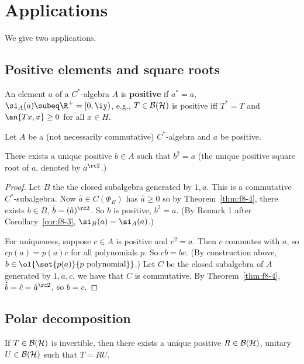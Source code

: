 \section{Applications}
We give two applications.

\subsection{Positive elements and square roots}
\begin{df}
An element $a$ of a $C^*$-algebra $A$ is \textbf{positive} if $a^*=a$, $\si_A(a)\subeq \R^+=[0,\iy)$, e.g., $T\in \cal B(H)$ is positive iff $T^*=T$ and $\an{Tx,x}\ge 0$ for all $x\in H$. 
\end{df}
\begin{thm}
Let $A$ be a (not necessarily commutative) $C^*$-algebra and $a$ be positive.

There exists a unique positive $b\in A$ such that $b^2=a$ (the unique positive square root of $a$, denoted by $a^{\rc 2}$.)
\end{thm}
\begin{proof}
Let $B$ the the closed subalgebra generated by $1,a$. This is a commutative $C^*$-subalgebra. Now $\hat a\in C(\Phi_B)$ has $\hat a\ge 0$ so by Theorem~\ref{thm:f8-4}, there exists $b\in B$, $\hat b=(\hat a)^{\rc 2}$. So $b$ is positive, $b^2=a$. (By Remark 1 after Corollary~\ref{cor:f8-3}, $\si_B(a)=\si_A(a)$.)

For uniqueness, suppose $c\in A$ is positive and $c^2=a$. Then $c$ commutes with $a$, so $cp(a)=p(a)c$ for all polynomials $p$. So $cb=bc$.  (By construction above, $b\in \ol{\set{p(a)}{p\text{ polynomial}}}$.)
Let $C$ be the closed subalgebra of $A$ generated by $1,a,c$, we have that  %
$C$ is commutative. By Theorem~\ref{thm:f8-4}, $\hat b=\hat c=\hat a^{\rc 2}$, so $b=c$.
\end{proof}

\subsection{Polar decomposition}

\begin{thm}
If $T\in \cal B(H)$ is invertible, then there exists a unique positive $R\in \cal B(H)$, unitary $U\in \cal B(H)$ such that $T=RU$. 
\end{thm}

